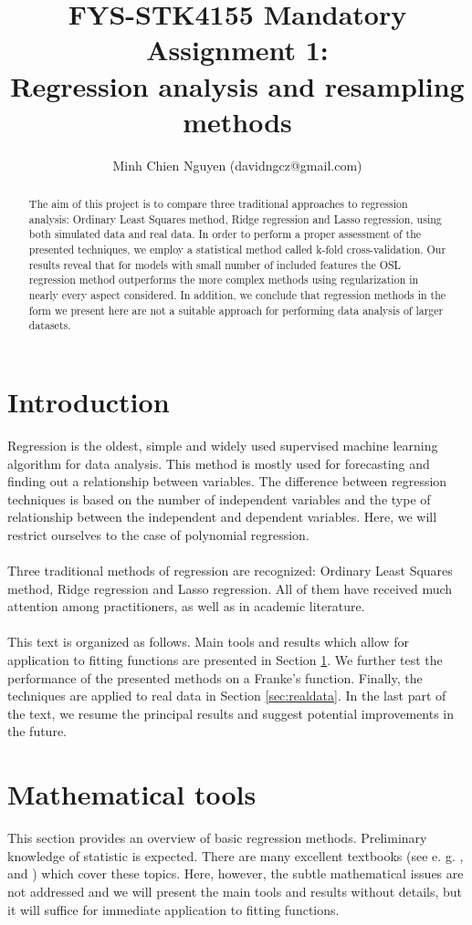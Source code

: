 \documentclass [11pt]{article}
\title{FYS-STK4155 Mandatory Assignment 1: \\ Regression analysis and resampling methods}
\author{Minh Chien Nguyen (davidngcz@gmail.com)}
\begin{document}
\maketitle
\nocite{*}
\begin{abstract}
The aim of this project is to compare three traditional approaches to regression analysis: Ordinary Least Squares method, Ridge regression and Lasso regression, using both simulated data and real data. In order to perform a proper assessment of the presented techniques, we employ a statistical method called k-fold cross-validation. Our results reveal that for models with small number of included features the OSL regression method outperforms the more complex methods using regularization in nearly every aspect considered. In addition, we conclude that regression methods in the form we present here are not a suitable approach for performing data analysis of larger datasets.
\end{abstract}

\section*{Introduction}
Regression is the oldest, simple and widely used supervised machine learning algorithm for data analysis. This method is mostly used for forecasting and finding out a relationship between variables. The difference between regression techniques is based on the number of independent variables and the type of relationship between the independent and dependent variables. Here, we will restrict ourselves to the case of polynomial regression.\\
\\
Three traditional methods of regression are recognized: Ordinary Least Squares method, Ridge regression and Lasso regression. All of them have received much attention among practitioners, as well as in academic literature.\\
\\
This text is organized as follows. Main tools and results which allow for application to fitting functions are presented in Section \ref{sec:techniques}. We further test the performance of the presented methods on a Franke's
function. Finally, the techniques are applied to real data in Section \ref{sec:realdata}. In the last part of the text, we resume the principal results and suggest potential improvements in the future.
\section{Mathematical tools}
\label{sec:techniques}
This section provides an overview of basic regression methods. Preliminary knowledge of statistic is expected. There are many excellent textbooks (see e. g. \cite{abc},\cite{TRJ} and \cite{def}) which cover these topics. Here, however, the subtle mathematical issues are not addressed and we will present the main tools and results without details, but it will suffice for immediate application to fitting functions.\\
\end{document}
